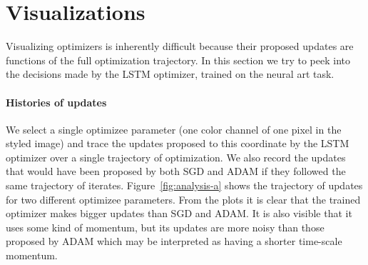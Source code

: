 \documentclass{article}
\begin{document}








\section{Visualizations}
\label{sec:proposed-updates}

Visualizing optimizers is inherently difficult because their proposed updates
are functions of the full optimization trajectory.  In this section we try to
peek into the decisions made by the LSTM optimizer, trained on the neural art
task.

\paragraph{Histories of updates}

We select a single optimizee parameter (one color channel of one pixel in the
styled image) and trace the updates proposed to this coordinate by the LSTM
optimizer over a single trajectory of optimization.  We also record the updates
that would have been proposed by both SGD and ADAM if they followed the same
trajectory of iterates.  Figure~\ref{fig:analysis-a} shows the trajectory of
updates for two different optimizee parameters.  From the plots it is clear
that the trained optimizer makes bigger updates than SGD and ADAM.  It is also
visible that it uses some kind of momentum, but its updates are more noisy than
those proposed by ADAM which may be interpreted as having a shorter time-scale
momentum.
\end{document}
